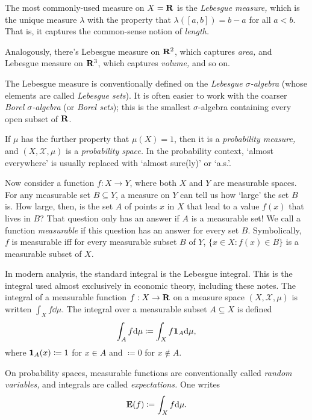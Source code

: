\documentclass[11pt,letterpaper,reqno,oneside]{book}
\begin{document}
\begin{appendices}
\begin{example}
	\label{example:lebesgue_measure}
	The most commonly-used measure on $X=\mathbf{R}$ is the \emph{Lebesgue measure,}
	which is the unique measure $\lambda$ with the property that
	$\lambda([a,b]) = b-a$ for all $a<b$.
	That is, it captures the common-sense notion of \emph{length.}

	Analogously, there's Lebesgue measure on $\mathbf{R}^2$, which captures \emph{area,} and Lebesgue measure on $\mathbf{R}^3$, which captures \emph{volume,} and so on.

	The Lebesgue measure is conventionally defined on the \emph{Lebesgue $\sigma$-algebra} (whose elements are called \emph{Lebesgue sets}).
	It is often easier to work with the coarser \emph{Borel $\sigma$-algebra} (or \emph{Borel sets}); this is the smallest $\sigma$-algebra containing every open subset of $\mathbf{R}$.
\end{example}

If $\mu$ has the further property that $\mu(X)=1$, then it is a \emph{probability measure,}
and $(X,\mathcal{X},\mu)$ is a \emph{probability space.}
In the probability context, `almost everywhere' is usually replaced with `almost sure(ly)' or `a.s.'.


Now consider a function $f : X \to Y$, where both $X$ and $Y$ are measurable spaces. For any measurable set $B \subseteq Y$, a measure on $Y$ can tell us how `large' the set $B$ is.
How large, then, is the set $A$ of points $x$ in $X$ that lead to a value $f(x)$ that lives in $B$?
That question only has an answer if $A$ is a measurable set!
We call a function \emph{measurable} if this question has an answer for every set $B$.
Symbolically, $f$ is measurable iff for every measurable subset $B$ of $Y$, $\{ x \in X : f(x) \in B \}$ is a measurable subset of $X$.

In modern analysis, the standard integral is the Lebesgue integral.
This is the integral used almost exclusively in economic theory, including these notes.
The integral of a measurable function $f : X \to \mathbf{R}$ on a measure space $(X,\mathcal{X},\mu)$ is written $\int_X f \dd \mu$.
The integral over a measurable subset $A \subseteq X$ is defined
%
\begin{equation*}
	\int_A f \mathrm{d} \mu \coloneqq \int_X f \boldsymbol{1}_A \mathrm{d} \mu ,
\end{equation*}
%
where $\boldsymbol{1}_A(x) \coloneqq 1$ for $x \in A$ and $\coloneqq 0$ for $x \notin A$.

On probability spaces, measurable functions are conventionally called \emph{random variables,}
and integrals are called \emph{expectations.}
One writes
%
\begin{equation*}
	\mathbf{E}( f ) \coloneqq \int_X f \mathrm{d} \mu .
\end{equation*}


\end{appendices}
\end{document}
